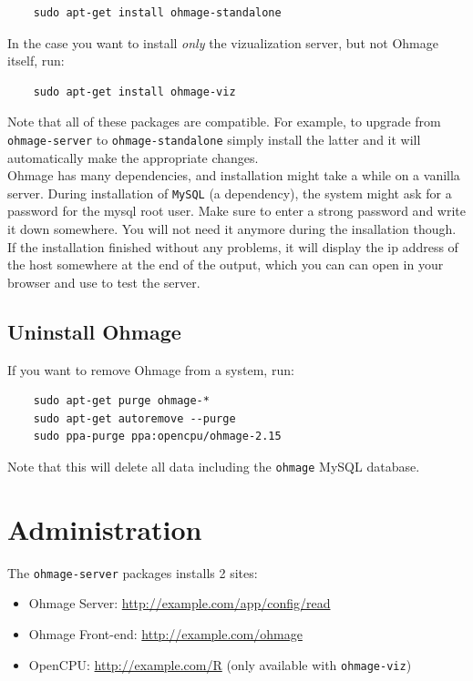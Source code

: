 \documentclass{scrartcl}
\begin{document}
\begin{verbatim}
    sudo apt-get install ohmage-standalone
\end{verbatim}
In the case you want to install \emph{only} the vizualization server, but not
Ohmage itself, run:
\begin{verbatim}
    sudo apt-get install ohmage-viz
\end{verbatim}
Note that all of these packages are compatible. For example, to upgrade from
\texttt{ohmage-server} to \texttt{ohmage-standalone} simply install the
latter and it will automatically make the appropriate changes. \\

\noindent Ohmage has many dependencies, and installation might take a while on
a vanilla server. During installation of \texttt{MySQL} (a dependency), the
system might ask for a password for the mysql root user. Make sure to enter a strong
password and write it down somewhere. You will not need it anymore during the
insallation though.\\

\noindent If the installation finished without any problems, it will display the
ip address of the host somewhere at the end of the output, which you can can
open in your browser and use to test the server. 

\subsection{Uninstall Ohmage}

If you want to remove Ohmage from a system, run:

\begin{verbatim}
    sudo apt-get purge ohmage-*
    sudo apt-get autoremove --purge
    sudo ppa-purge ppa:opencpu/ohmage-2.15
\end{verbatim}
Note that this will delete all data including the \texttt{ohmage} MySQL
database.

\section{Administration}

The \texttt{ohmage-server} packages installs 2 sites:

\begin{itemize}
  \item Ohmage Server: \url{http://example.com/app/config/read}
  \item Ohmage Front-end: \url{http://example.com/ohmage}
  \item OpenCPU: \url{http://example.com/R} (only available with
  \texttt{ohmage-viz})
\end{itemize}
\end{document}
